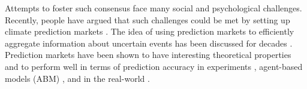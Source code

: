 \documentclass{article}\usepackage[]{graphicx}\usepackage[]{color}
\begin{document}
Attempts to foster such consensus face many social and psychological challenges. Recently, people have argued that such challenges could be met by setting up climate prediction markets \cite{Hsu2011,Vandenbergh2013f}. The idea of using prediction markets to efficiently aggregate information about uncertain events has been discussed for decades \cite{Horn2014c}. Prediction markets have been shown to have interesting theoretical properties \cite{Set1998,Hanson2012} and to perform well in terms of prediction accuracy in experiments \cite{Hanson2006,Healy2010}, agent-based models (ABM) \cite{Klingert2012c,Jumadinova2011a}, and in the real-world \cite{Wolfers2006}.

\end{document}
